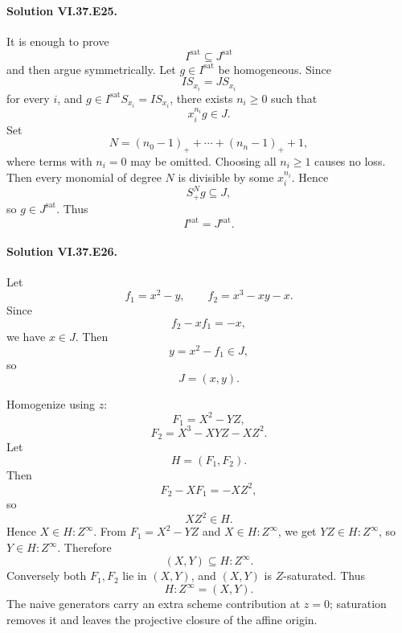 \paragraph{Solution VI.37.E25.}
It is enough to prove
\[
I^{\mathrm{sat}}\subseteq J^{\mathrm{sat}}
\]
and then argue symmetrically. Let \(g\in I^{\mathrm{sat}}\) be homogeneous. Since
\[
IS_{x_i}=JS_{x_i}
\]
for every \(i\), and \(g\in I^{\mathrm{sat}}S_{x_i}=IS_{x_i}\), there exists \(n_i\ge0\) such that
\[
x_i^{n_i}g\in J.
\]
Set
\[
N=(n_0-1)_++\cdots+(n_n-1)_++1,
\]
where terms with \(n_i=0\) may be omitted. Choosing all \(n_i\ge1\) causes no loss. Then every monomial of degree \(N\) is divisible by some \(x_i^{n_i}\). Hence
\[
S_+^Ng\subseteq J,
\]
so \(g\in J^{\mathrm{sat}}\). Thus
\[
\boxed{I^{\mathrm{sat}}=J^{\mathrm{sat}}}.
\]

\paragraph{Solution VI.37.E26.}
Let
\[
f_1=x^2-y,\qquad
f_2=x^3-xy-x.
\]
Since
\[
f_2-xf_1=-x,
\]
we have \(x\in J\). Then
\[
y=x^2-f_1\in J,
\]
so
\[
J=(x,y).
\]

Homogenize using \(z\):
\[
F_1=X^2-YZ,
\]
\[
F_2=X^3-XYZ-XZ^2.
\]
Let
\[
H=(F_1,F_2).
\]
Then
\[
F_2-XF_1=-XZ^2,
\]
so
\[
XZ^2\in H.
\]
Hence \(X\in H:Z^\infty\). From \(F_1=X^2-YZ\) and \(X\in H:Z^\infty\), we get \(YZ\in H:Z^\infty\), so \(Y\in H:Z^\infty\). Therefore
\[
(X,Y)\subseteq H:Z^\infty.
\]
Conversely both \(F_1,F_2\) lie in \((X,Y)\), and \((X,Y)\) is \(Z\)-saturated. Thus
\[
\boxed{H:Z^\infty=(X,Y)}.
\]
The naive generators carry an extra scheme contribution at \(z=0\); saturation removes it and leaves the projective closure of the affine origin.

